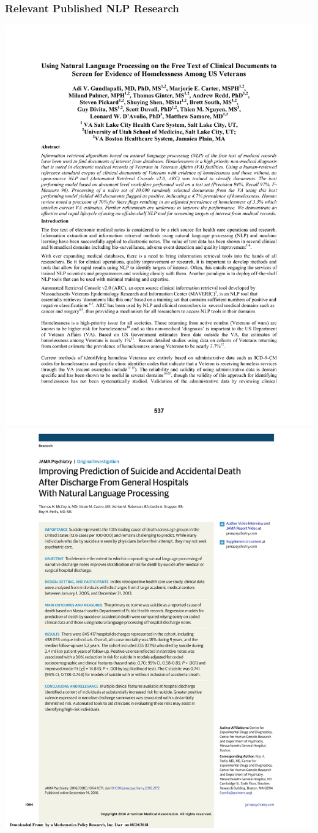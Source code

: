 \documentclass[smaller,xcolor=table,aspectratio=169]{beamer}
\begin{document}
\begin{frame}
  \frametitle{Relevant Published NLP Research}
  \includegraphics[page=1,height=0.5\textheight,bb=0 0 8.5in 4in,clip]{images/gundlapalli-amia-2013.pdf}
  \includegraphics[page=1,height=0.5\textheight]{images/mccoy-jama-2016.pdf}

\end{frame}
\end{document}
